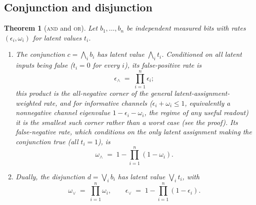 \documentclass[a4paper,onecolumn,unpublished,nopdfoutputerror,allowtoday]{quantumarticle}
\numberwithin{equation}{section}
\theoremstyle{plain}
\newtheorem{theorem}{Theorem}[section]
\theoremstyle{definition}
\theoremstyle{remark}
\newcommand{\eps}{\epsilon}
\begin{document}
\subsection{Conjunction and disjunction}

\begin{theorem}[\textsc{and} and \textsc{or}]
\label{thm:andor}
Let $b_1,\dots,b_n$ be independent measured bits with rates
$(\eps_i,\omega_i)$ for latent values $t_i$.
\begin{enumerate}[label=(\roman*),leftmargin=2em]
  \item The conjunction $c=\bigwedge_i b_i$ has latent value $\bigwedge_i t_i$.
        Conditioned on all latent inputs being false ($t_i=0$ for every $i$), its
        false-positive rate is
        \begin{equation}
        \label{eq:and-fpr}
          \eps_{\wedge} \;=\; \prod_{i=1}^{n} \eps_i ;
        \end{equation}
        this product is the all-negative corner of the general
        latent-assignment-weighted rate, and for informative channels
        ($\eps_i+\omega_i\le1$, equivalently a nonnegative channel eigenvalue
        $1-\eps_i-\omega_i$, the regime of any useful readout) it is the
        smallest such corner rather than a worst case (see the proof). Its false-negative rate, which conditions on
        the only latent assignment making the conjunction true (all $t_i=1$), is
        \begin{equation}
        \label{eq:and-fnr}
          \omega_{\wedge} \;=\; 1 - \prod_{i=1}^{n}(1-\omega_i).
        \end{equation}
  \item Dually, the disjunction $d=\bigvee_i b_i$ has latent value
        $\bigvee_i t_i$, with
        \begin{equation}
        \label{eq:or}
          \omega_{\vee} \;=\; \prod_{i=1}^{n}\omega_i,
          \qquad
          \eps_{\vee} \;=\; 1 - \prod_{i=1}^{n}(1-\eps_i).
        \end{equation}
\end{enumerate}
\end{theorem}
\end{document}
